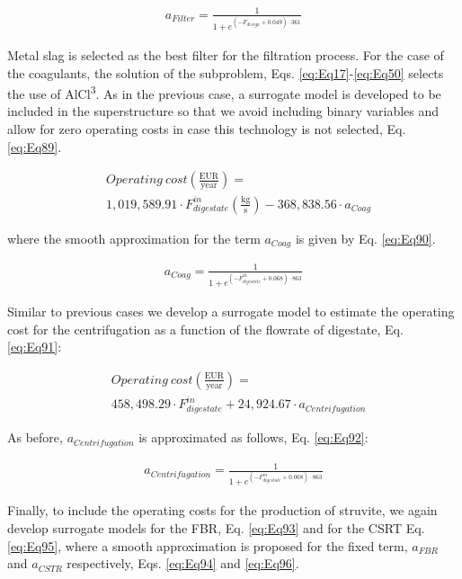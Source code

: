 \begin{refsection}[referencesCh2]
\begin{align}
	a_{Filter} = \frac{1}{1 + {e^{\left( -{F_{design}} + {0.049} \right) \cdot 361}}} \label{eq:Eq88}
\end{align}

Metal slag is selected as the best filter for the filtration process. For the case of the coagulants, the solution of the subproblem, Eqs. \ref{eq:Eq17}-\ref{eq:Eq50} selects the use of AlCl\textsuperscript{3}. As in the previous case, a surrogate model is developed to be included in the superstructure so that we avoid including binary variables and allow for zero operating costs in case this technology is not selected, Eq. \ref{eq:Eq89}.

\begin{align}
	& {Operating \ cost} \left( \frac{\text{EUR}}{\text{year}} \right) = \label{eq:Eq89} \\
	& 1,019,589.91 \cdot F_{digestate}^{in} \left( \frac{\text{kg}}{\text{s}} \right) -368,838.56 \cdot {a}_{Coag} \nonumber
\end{align}

where the smooth approximation for the term ${a}_{Coag}$ is given by Eq. \ref{eq:Eq90}.

\begin{align}
	{a}_{Coag} = \frac{1}{1 + e^{\left( -F_{digestate}^{in} + 0.068 \right) \cdot 863}} \label{eq:Eq90}
\end{align}

Similar to previous cases we develop a surrogate model to estimate the operating cost for the centrifugation as a function of the flowrate of digestate, Eq. \ref{eq:Eq91}:

\begin{align}
	& {Operating \ cost} \left( \frac{\text{EUR}}{\text{year}} \right) = \label{eq:Eq91} \\
	& 458,498.29 \cdot F_{digestate}^{in} +  24,924.67 \cdot {a}_{Centrifugation} \nonumber
\end{align}

As before, ${a}_{Centrifugation}$ is approximated as follows, Eq. \ref{eq:Eq92}:

\begin{align}
	{a}_{Centrifugation} = \frac{1}{1 + e^{\left( { - F_{digestate}^{in} + 0.068} \right) \cdot 863}} \label{eq:Eq92}
\end{align}

Finally, to include the operating costs for the production of struvite, we again develop surrogate models for the FBR, Eq. \ref{eq:Eq93} and for the CSRT Eq. \ref{eq:Eq95}, where a smooth approximation is proposed for the fixed term, $a_{FBR}$ and $a_{CSTR}$ respectively, Eqs. \ref{eq:Eq94} and \ref{eq:Eq96}.


\end{refsection}
